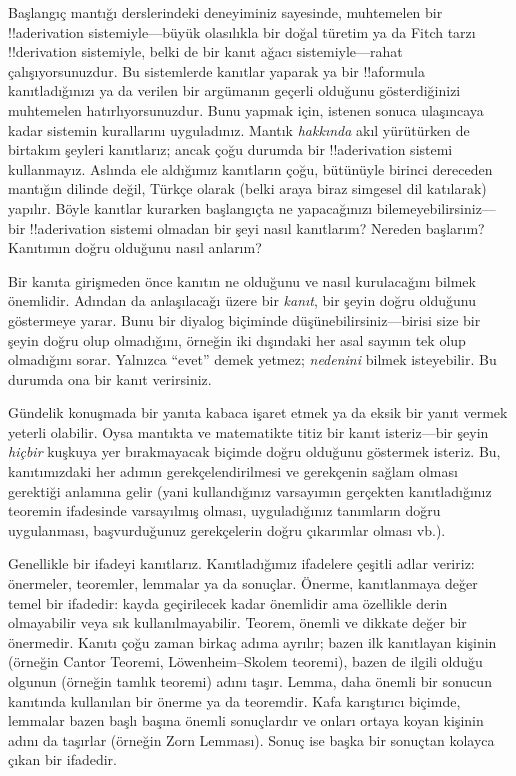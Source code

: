 



Başlangıç mantığı derslerindeki deneyiminiz sayesinde, muhtemelen bir
!!a{derivation} sistemiyle---büyük olasılıkla bir doğal türetim ya da
Fitch tarzı !!{derivation} sistemiyle, belki de bir kanıt ağacı
sistemiyle---rahat çalışıyorsunuzdur. Bu sistemlerde kanıtlar yaparak ya
bir !!a{formula} kanıtladığınızı ya da verilen bir argümanın geçerli
olduğunu gösterdiğinizi muhtemelen hatırlıyorsunuzdur. Bunu yapmak için,
istenen sonuca ulaşıncaya kadar sistemin kurallarını uyguladınız. Mantık
\emph{hakkında} akıl yürütürken de birtakım şeyleri kanıtlarız; ancak
çoğu durumda bir !!a{derivation} sistemi kullanmayız. Aslında ele
aldığımız kanıtların çoğu, bütünüyle birinci dereceden mantığın dilinde
değil, Türkçe olarak (belki araya biraz simgesel dil katılarak)
yapılır. Böyle kanıtlar kurarken başlangıçta ne yapacağınızı
bilemeyebilirsiniz---bir !!a{derivation} sistemi olmadan bir şeyi nasıl
kanıtlarım? Nereden başlarım? Kanıtımın doğru olduğunu nasıl anlarım?

Bir kanıta girişmeden önce kanıtın ne olduğunu ve nasıl kurulacağını
bilmek önemlidir. Adından da anlaşılacağı üzere bir \emph{kanıt}, bir
şeyin doğru olduğunu göstermeye yarar. Bunu bir diyalog biçiminde
düşünebilirsiniz---birisi size bir şeyin doğru olup olmadığını, örneğin
iki dışındaki her asal sayının tek olup olmadığını sorar. Yalnızca
``evet'' demek yetmez; \emph{nedenini} bilmek isteyebilir. Bu durumda ona
bir kanıt verirsiniz.

Gündelik konuşmada bir yanıta kabaca işaret etmek ya da eksik bir yanıt
vermek yeterli olabilir. Oysa mantıkta ve matematikte titiz bir kanıt
isteriz---bir şeyin \emph{hiçbir} kuşkuya yer bırakmayacak biçimde doğru
olduğunu göstermek isteriz. Bu, kanıtımızdaki her adımın
gerekçelendirilmesi ve gerekçenin sağlam olması gerektiği anlamına gelir
(yani kullandığınız varsayımın gerçekten kanıtladığınız teoremin
ifadesinde varsayılmış olması, uyguladığınız tanımların doğru
uygulanması, başvurduğunuz gerekçelerin doğru çıkarımlar olması vb.).

Genellikle bir ifadeyi kanıtlarız. Kanıtladığımız ifadelere çeşitli
adlar veririz: önermeler, teoremler, lemmalar ya da sonuçlar. Önerme,
kanıtlanmaya değer temel bir ifadedir: kayda geçirilecek kadar önemlidir
ama özellikle derin olmayabilir veya sık kullanılmayabilir. Teorem,
önemli ve dikkate değer bir önermedir. Kanıtı çoğu zaman birkaç adıma
ayrılır; bazen ilk kanıtlayan kişinin (örneğin Cantor Teoremi,
L\"owenheim--Skolem teoremi), bazen de ilgili olduğu olgunun (örneğin
tamlık teoremi) adını taşır. Lemma, daha önemli bir sonucun kanıtında
kullanılan bir önerme ya da teoremdir. Kafa karıştırıcı biçimde,
lemmalar bazen başlı başına önemli sonuçlardır ve onları ortaya koyan
kişinin adını da taşırlar (örneğin Zorn Lemması). Sonuç ise başka bir
sonuçtan kolayca çıkan bir ifadedir.

